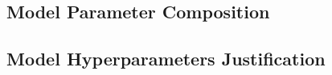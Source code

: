 \documentclass[master]{thesis-uestc}
\begin{document}

\subsection{Model Parameter Composition}
\subsection{Model Hyperparameters Justification}
\end{document}
